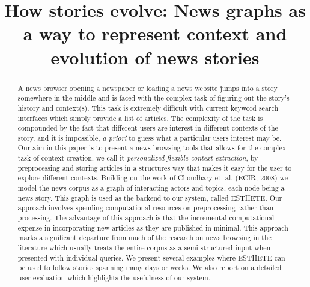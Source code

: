 \documentclass{acm_proc_article-sp}
\begin{document}
\title{How stories evolve: News graphs as a way to represent context and evolution of news stories}

%
\author{
%
}


\maketitle
\begin{abstract}
A news browser opening a newspaper or loading a news website jumps
into a story somewhere in the middle and is faced with the complex
task of figuring out the story's history and context(s). This task is
extremely difficult with current keyword search interfaces which
simply provide a list of articles. The complexity of the task is
compounded by the fact that different users are interest in different
contexts of the story, and it is impossible, {\em a priori} to guess
what a particular users interest may be. Our aim in this paper is to
present a news-browsing tools that allows for the complex task of
context creation, we call it {\em personalized flexible context
  extraction}, by preprocessing and storing articles in a structures
way that makes it easy for the user to explore different
contexts. Building on the work of Choudhary et. al. (ECIR, 2008) we
model the news corpus as a graph of interacting actors and topics,
each node being a news story. This graph is used as the backend to our
system, called ESTHETE.  Our approach involves spending computational
resources on preprocessing rather than processing. The advantage of
this approach is that the incremental computational expense in
incorporating new articles as they are published in minimal. This
approach marks a significant departure from much of the research on
news browsing in the literature which usually treats the entire corpus
as a semi-structured input when presented with individual queries. We
present several examples where ESTHETE can be used to follow stories
spanning many days or weeks. We also report on a detailed user
evaluation which highlights the usefulness of our system.

\end{abstract}
\end{document}
